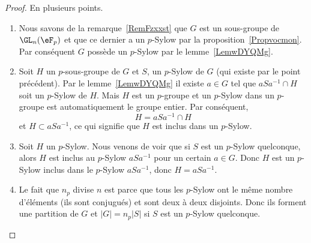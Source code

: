 \begin{proof}
    En plusieurs points.
    \begin{enumerate}
        \item

            Nous savons de la remarque~\ref{RemFzxxst} que \( G\) est un sous-groupe de \( \GL_n(\eF_p)\) et que ce dernier a un $p$-Sylow par la proposition~\ref{Propvocmon}. Par conséquent \( G\) possède un $p$-Sylow par le lemme~\ref{LemwDYQMg}.

        \item

            Soit \( H\) un \( p\)-sous-groupe de \( G\) et \( S\), un $p$-Sylow de \( G\) (qui existe par le point précédent). Par le lemme~\ref{LemwDYQMg} il existe \( a\in G\) tel que \( aSa^{-1}\cap H\) soit un $p$-Sylow de \( H\). Mais \( H\) est un \(p\)-groupe et un $p$-Sylow dans un \( p\)-groupe est automatiquement le groupe entier. Par conséquent,
            \begin{equation}
                H=aSa^{-1}\cap H
            \end{equation}
            et \( H\subset aSa^{-1}\), ce qui signifie que \( H\) est inclus dans un $p$-Sylow.

        \item

            Soit \( H\) un $p$-Sylow. Nous venons de voir que si \( S\) est un $p$-Sylow quelconque, alors \( H\) est inclus au $p$-Sylow \( aSa^{-1}\) pour un certain \( a\in G\). Donc \( H\) est un $p$-Sylow inclus dans le $p$-Sylow \( aSa^{-1}\), donc \( H=aSa^{-1}\).

        \item

            Le fait que \( n_p\) divise \( n\) est parce que tous les $p$-Sylow ont le même nombre d'éléments (ils sont conjugués) et sont deux à deux disjoints. Donc ils forment une partition de \( G\) et \( | G |=n_p| S |\) si \( S\) est un $p$-Sylow quelconque.


\end{enumerate}
\end{proof}
